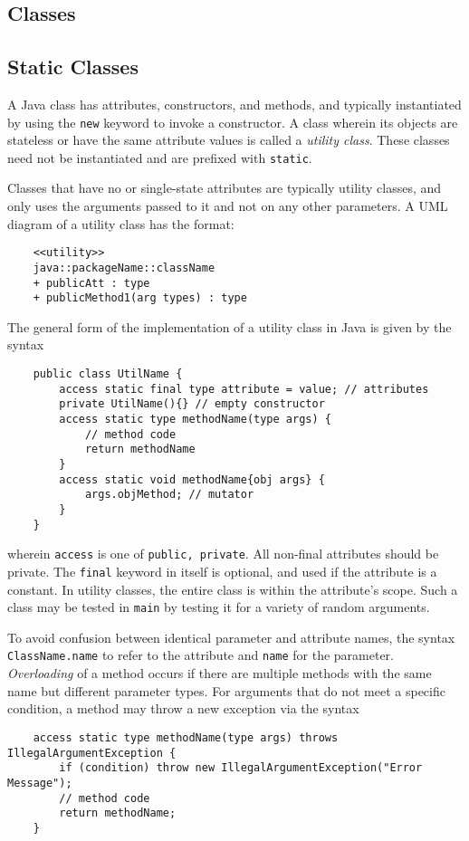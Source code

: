 \documentclass[letterpaper, openany, justified]{tufte-book}
\newcommand{\cd}[1]{\lstinline{#1}}
\begin{document}
\begin{fullwidth}
\chapter{Classes}

\section{Static Classes}
A Java class has attributes, constructors, and methods, and typically instantiated by using the \cd{new} keyword to invoke a constructor. A class wherein its objects are stateless or have the same attribute values is called a \emph{utility class}. These classes need not be instantiated and are prefixed with \cd{static}.

\bigskip
Classes that have no or single-state attributes are typically utility classes, and only uses the arguments passed to it and not on any other parameters. A UML diagram of a utility class has the format:
\begin{lstlisting}
    <<utility>>
    java::packageName::className
    + publicAtt : type
    + publicMethod1(arg types) : type
\end{lstlisting}
The general form of the implementation of a utility class in Java is given by the syntax
\begin{lstlisting}
    public class UtilName {
        access static final type attribute = value; // attributes
        private UtilName(){} // empty constructor
        access static type methodName(type args) {
            // method code
            return methodName
        }
        access static void methodName{obj args} {
            args.objMethod; // mutator
        }
    }
\end{lstlisting}
wherein \cd{access} is one of \cd{public, private}. All non-final attributes should be private. The \cd{final} keyword in itself is optional, and used if the attribute is a constant. In utility classes, the entire class is within the attribute's scope. Such a class may be tested in \cd{main} by testing it for a variety of random arguments.

\bigskip
To avoid confusion between identical parameter and attribute names, the syntax \cd{ClassName.name} to refer to the attribute and \cd{name} for the parameter. \emph{Overloading} of a method occurs if there are multiple methods with the same name but different parameter types. For arguments that do not meet a specific condition, a method may throw a new exception via the syntax
\begin{lstlisting}
    access static type methodName(type args) throws IllegalArgumentException {
        if (condition) throw new IllegalArgumentException("Error Message");
        // method code
        return methodName;
    }
\end{lstlisting}


\end{fullwidth}
\end{document}
